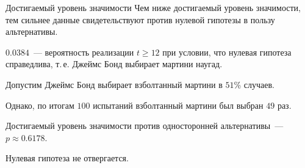 \documentclass[11pt,pdf,utf8,hyperref={unicode},aspectratio=169]{beamer}
\begin{document}
\begin{frame}{Достигаемый уровень значимости}
%
		Чем ниже достигаемый уровень значимости, тем сильнее данные свидетельствуют против нулевой гипотезы в пользу альтернативы.

		\bigskip

		$0.0384$~--- вероятность реализации $t\geqslant  12$ при условии, что нулевая гипотеза справедлива, т.\,е. Джеймс Бонд выбирает мартини наугад.

%

    \bigskip

		 Допустим Джеймс Бонд выбирает взболтанный мартини в $51$\% случаев.

		Однако, по итогам $100$ испытаний взболтанный мартини был выбран $49$ раз.

		\bigskip

        Достигаемый уровень значимости против односторонней альтернативы~--- $p\approx 0.6178.$

        \bigskip

        Нулевая гипотеза не отвергается.

\end{frame}
\end{document}

